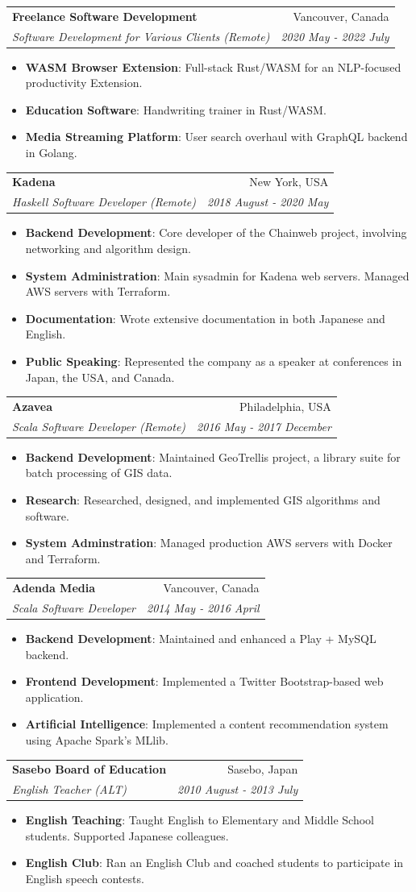 \documentclass[letterpaper,11pt]{article}
\makeatletter
\newcommand{\resumeItem}[2]{
  \item\small{
    \textbf{#1}{: #2 \vspace{-2pt}}
  }
}
\newcommand{\resumeSubheading}[4]{
  \vspace{-1pt}\item
    \begin{tabular*}{0.97\textwidth}[t]{l@{\extracolsep{\fill}}r}
      \textbf{#1} & #2 \\
      \textit{\small#3} & \textit{\small #4} \\
    \end{tabular*}\vspace{-5pt}
}
\newcommand{\resumeItemListStart}{\begin{itemize}}
\newcommand{\resumeItemListEnd}{\end{itemize}\vspace{-5pt}}
\makeatother
\begin{document}
\resumeSubheading
    {Freelance Software Development}{Vancouver, Canada}
    {Software Development for Various Clients (Remote)}{2020 May - 2022 July}
    \resumeItemListStart
    \resumeItem{WASM Browser Extension}{Full-stack Rust/WASM for an NLP-focused productivity Extension.}
    \resumeItem{Education Software}{Handwriting trainer in Rust/WASM.}
    \resumeItem{Media Streaming Platform}{User search overhaul with GraphQL backend in Golang.}
    \resumeItemListEnd

\resumeSubheading
    {Kadena}{New York, USA}
    {Haskell Software Developer (Remote)}{2018 August - 2020 May}
    \resumeItemListStart
    \resumeItem{Backend Development}{Core developer of the Chainweb project, involving networking and algorithm design.}
    \resumeItem{System Administration}{Main sysadmin for Kadena web servers. Managed AWS servers with Terraform.}
    \resumeItem{Documentation}{Wrote extensive documentation in both Japanese and English.}
    \resumeItem{Public Speaking}{Represented the company as a speaker at conferences in Japan, the USA, and Canada.}
    \resumeItemListEnd

\resumeSubheading
    {Azavea}{Philadelphia, USA}
    {Scala Software Developer (Remote)}{2016 May - 2017 December}
    \resumeItemListStart
    \resumeItem{Backend Development}{Maintained GeoTrellis project, a library suite for batch processing of GIS data.}
    \resumeItem{Research}{Researched, designed, and implemented GIS algorithms and software.}
    \resumeItem{System Adminstration}{Managed production AWS servers with Docker and Terraform.}
    \resumeItemListEnd

\resumeSubheading
    {Adenda Media}{Vancouver, Canada}
    {Scala Software Developer}{2014 May - 2016 April}
    \resumeItemListStart
    \resumeItem{Backend Development}{Maintained and enhanced a Play + MySQL backend.}
    \resumeItem{Frontend Development}{Implemented a Twitter Bootstrap-based web application.}
    \resumeItem{Artificial Intelligence}{Implemented a content recommendation system using Apache Spark's MLlib.}
    \resumeItemListEnd

\resumeSubheading
    {Sasebo Board of Education}{Sasebo, Japan}
    {English Teacher (ALT)}{2010 August - 2013 July}
    \resumeItemListStart
    \resumeItem{English Teaching}{Taught English to Elementary and Middle School students. Supported Japanese colleagues.}
    \resumeItem{English Club}{Ran an English Club and coached students to participate in English speech contests.}
    \resumeItemListEnd
\end{document}
